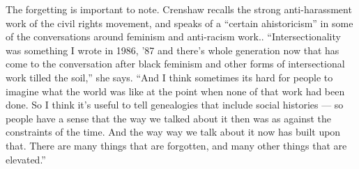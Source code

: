 \documentclass{article}
\begin{document}
The forgetting is important to note. Crenshaw recalls the strong
anti-harassment work of the civil rights movement, and speaks of a ``certain
ahistoricism'' in some of the conversations around feminism and anti-racism
work.. ``Intersectionality was something I wrote in 1986, '87 and there's whole
generation now that has come to the conversation after black feminism and other
forms of intersectional work tilled the soil,'' she says. ``And I think
sometimes its hard for people to imagine what the world was like at the point
when none of that work had been done. So I think it's useful to tell
genealogies that include social histories --- so people have a sense that the
way we talked about it then was as against the constraints of the time. And the
way way we talk about it now has built upon that. There are many things that
are forgotten, and many other things that are elevated.''
\end{document}

